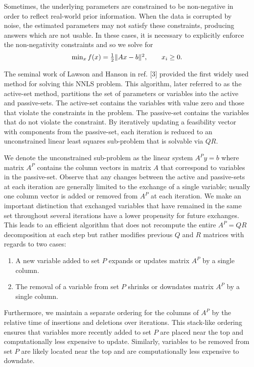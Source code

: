 \documentclass{report}
\begin{document}
Sometimes, the underlying parameters are constrained to be non-negative
in order to reflect real-world prior information. When the data is
corrupted by noise, the estimated parameters may not satisfy these
constraints, producing answers which are not usable. In these cases, it
is necessary to explicitly enforce the non-negativity constraints and so
we solve for
\begin{eqnarray} \begin{array}{c}
\min_xf(x)=\frac{1}{2}\|Ax-b\|^2,\qquad x_i\geq 0.
\end{array}\nonumber \end{eqnarray}

The seminal work of Lawson and Hanson in ref. [3] provided the first
widely used method for solving this NNLS problem. This algorithm, later
referred to as the active-set method, partitions the set of parameters or
variables into the active and passive-sets. The active-set contains the
variables with value zero and those that violate the constraints in the
problem. The passive-set contains the variables that do not violate the
constraint. By iteratively updating a feasibility vector with components
from the passive-set, each iteration is reduced to an unconstrained
linear least squares sub-problem that is solvable via $QR$.

We denote the unconstrained sub-problem as the linear system $A^Py=b$
where matrix $A^P$ contains the column vectors in matrix $A$ that
correspond to variables in the passive-set. Observe that any changes
between the active and passive-sets at each iteration are generally
limited to the exchange of a single variable; usually one column vector
is added or removed from $A^P$ at each iteration. We make an important
distinction that exchanged variables that have remained in the same set
throughout several iterations have a lower propensity for future
exchanges. This leads to an efficient algorithm that does not recompute
the entire $A^P=QR$ decomposition at each step but rather modifies
previous $Q$ and $R$ matrices with regards to two cases:
\begin{enumerate}
\item A new variable added to set $P$ expands or updates matrix $A^P$ by a single column.
\item The removal of a variable from set $P$ shrinks or downdates matrix
$A^P$ by a single column.
\end{enumerate}
Furthermore, we maintain a separate ordering for the columns of $A^P$ by
the relative time of insertions and deletions over iterations. This
stack-like ordering ensures that variables more recently added to set $P$
are placed near the top and computationally less expensive to update.
Similarly, variables to be removed from set $P$ are likely located near
the top and are computationally less expensive to downdate.
\end{document}
